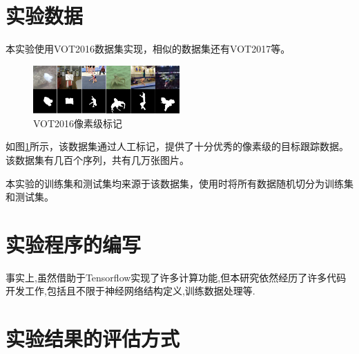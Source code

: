 \section{实验数据}
本实验使用VOT2016数据集\supercite{Vojir-TR-2017-01}实现，相似的数据集还有VOT2017等。
\par
\begin{figure}[htbp!]
    \centering
    \includegraphics[width = 0.5\textwidth]{chap/img/vot_2016_pixel.png}
    \caption{VOT2016像素级标记}\label{fig:vot_2016_pixel}
\end{figure}
\par
如图\ref{fig:vot_2016_pixel}所示，该数据集通过人工标记，提供了十分优秀的像素级的目标跟踪数据。该数据集有几百个序列，共有几万张图片。
\par
本实验的训练集和测试集均来源于该数据集，使用时将所有数据随机切分为训练集和测试集。


\section{实验程序的编写}
事实上,虽然借助于Tensorflow实现了许多计算功能,但本研究依然经历了许多代码开发工作,包括且不限于神经网络结构定义,训练数据处理等.

\section{实验结果的评估方式}